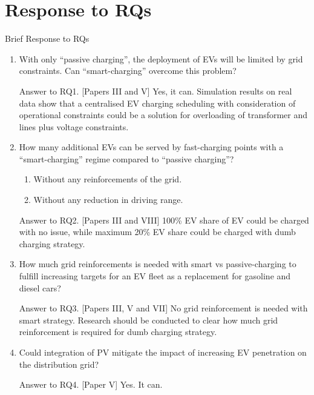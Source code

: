 \documentclass[aspectratio=169]{beamer}
\begin{document}
\section{Response to RQs}
\begin{frame}{Brief Response to RQs}
\begin{enumerate}[label=\textbf{RQ {\arabic*}.},ref=RQ {\arabic*}.]
\item<1> \label{int:RQ1} With only ``passive charging'', the deployment of EVs will be limited by grid constraints. Can ``smart-charging'' overcome this problem?\\
 { \begin{block}{Answer to RQ1. [Papers III and V]}
Yes, it can. Simulation results on real data show that a centralised EV charging scheduling with consideration of operational constraints could be a solution for overloading of transformer and lines plus voltage constraints.
\end{block} }
\item<2> \label{int:RQ2} How many additional EVs can be served by fast-charging points with a ``smart-charging'' regime compared to ``passive charging''? 
\begin{enumerate}[label=\textbf{C {\arabic*}.},ref=C {\arabic*}.]
\item<2> \label{int:con1}  Without any reinforcements of the grid. 
\item<2> \label{int:con2} Without any reduction in driving range.
\end{enumerate} { \begin{block}{Answer to RQ2. [Papers III and VIII]} 100\% EV share of EV could be charged with no issue, while maximum 20\% EV share could be charged with dumb charging strategy.\end{block}}
\item<3-> \vskip -0.1cm \label{int:RQ3} How much grid reinforcements is needed with smart vs passive-charging to fulfill increasing targets for an EV fleet as a replacement for gasoline and diesel cars?
 {\vskip -0.1cm \begin{block}{Answer to RQ3. [Papers III, V and VII]}
No grid reinforcement is needed with smart strategy. Research should be conducted to clear how much grid reinforcement is required for dumb charging strategy.
\end{block}}

\item<4-> \label{int:RQ4} Could integration of PV mitigate the impact of increasing EV penetration on the distribution grid?
 { \vskip -0.2cm \begin{block}{Answer to RQ4. [Paper V]}
Yes. It can.
\end{block}}
\end{enumerate}
\end{frame}
\end{document}
